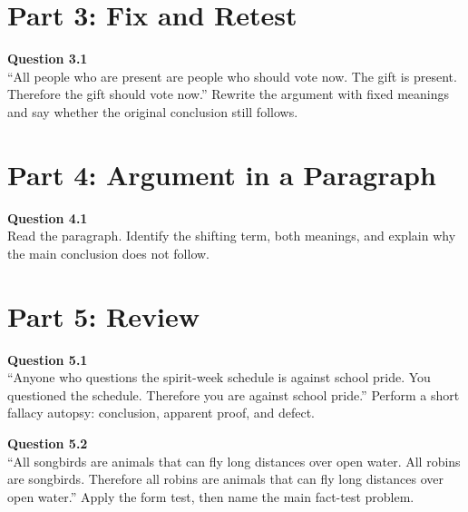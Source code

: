 \documentclass[12pt]{article}
\begin{document}
\section*{Part 3: Fix and Retest}

\textbf{Question 3.1}\\[-0.15em]
``All people who are present are people who should vote now. The gift is present. Therefore the gift should vote now.'' Rewrite the argument with fixed meanings and say whether the original conclusion still follows.


\newpage

\section*{Part 4: Argument in a Paragraph}

\textbf{Question 4.1}\\[-0.15em]
Read the paragraph. Identify the shifting term, both meanings, and explain why the main conclusion does not follow.

\vspace{0.2em}

\noindent{}


\newpage

\section*{Part 5: Review}

\textbf{Question 5.1}\\[-0.15em]
``Anyone who questions the spirit-week schedule is against school pride. You questioned the schedule. Therefore you are against school pride.'' Perform a short fallacy autopsy: conclusion, apparent proof, and defect.


\textbf{Question 5.2}\\[-0.15em]
``All songbirds are animals that can fly long distances over open water. All robins are songbirds. Therefore all robins are animals that can fly long distances over open water.'' Apply the form test, then name the main fact-test problem.

\end{document}

